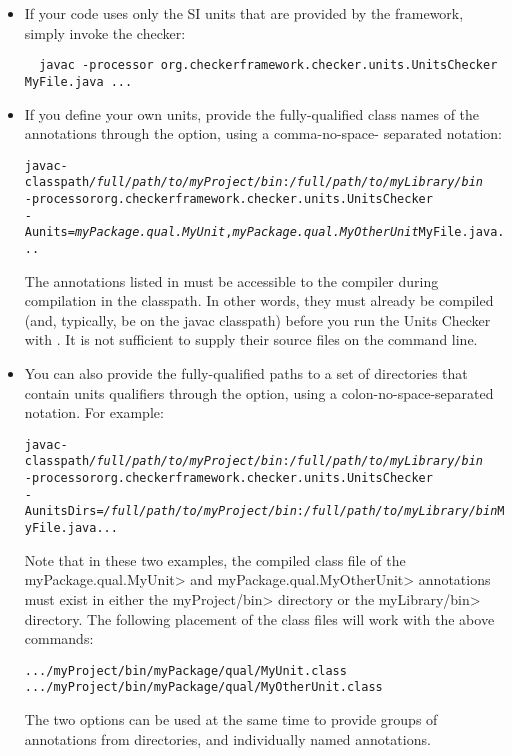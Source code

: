\begin{itemize}

\item If your code uses only the SI units that are provided by the framework,
simply invoke the checker:

\begin{Verbatim}
  javac -processor org.checkerframework.checker.units.UnitsChecker MyFile.java ...
\end{Verbatim}

\item If you define your own units, provide the fully-qualified class names of
the annotations through the  option, using a comma-no-space-
separated notation:

\begin{alltt}
  javac -classpath \textit{/full/path/to/myProject/bin}:\textit{/full/path/to/myLibrary/bin} \ttbs
        -processor org.checkerframework.checker.units.UnitsChecker \ttbs
        -Aunits=\textit{myPackage.qual.MyUnit},\textit{myPackage.qual.MyOtherUnit} MyFile.java ...
\end{alltt}

The annotations listed in  must be accessible to the compiler
during compilation in the classpath. In other words, they must already be
compiled (and, typically, be on the javac classpath) before you run the Units
Checker with . It is not sufficient to supply their source files on
the command line.

\item You can also provide the fully-qualified paths to a set of directories
that contain units qualifiers through the  option, using a
colon-no-space-separated notation. For example:

\begin{alltt}
  javac -classpath \textit{/full/path/to/myProject/bin}:\textit{/full/path/to/myLibrary/bin} \ttbs
        -processor org.checkerframework.checker.units.UnitsChecker \ttbs
        -AunitsDirs=\textit{/full/path/to/myProject/bin}:\textit{/full/path/to/myLibrary/bin} MyFile.java ...
\end{alltt}

Note that in these two examples, the compiled class file of the
\<myPackage.qual.MyUnit> and \<myPackage.qual.MyOtherUnit> annotations must
exist in either the \<myProject/bin> directory or the \<myLibrary/bin>
directory. The following placement of the class files will work with the above
commands:

\begin{alltt}
  .../myProject/bin/myPackage/qual/MyUnit.class
  .../myProject/bin/myPackage/qual/MyOtherUnit.class
\end{alltt}

The two options can be used at the same time to provide groups of annotations
from directories, and individually named annotations.

\end{itemize}

